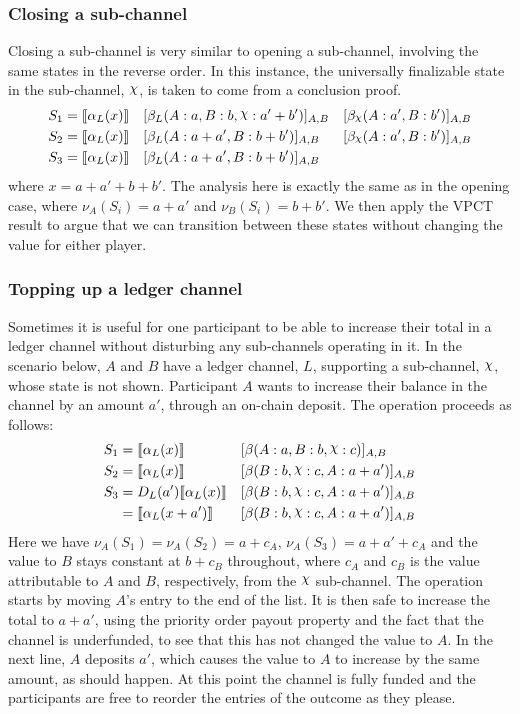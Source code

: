 \documentclass{article}
\DeclareRobustCommand{\rchi}{{\mathpalette\irchi\relax}}
\newcommand{\irchi}[2]{\raisebox{\depth}{$#1\chi$}} %
\theoremstyle{definition}
\newcommand{\adj}[1]{\llbracket #1 \rrbracket}
\newcommand{\enf}[1]{[#1]}
\begin{document}
\subsubsection{Closing a sub-channel}

Closing a sub-channel is very similar to opening a sub-channel, involving the same states in the reverse order.
In this instance, the universally finalizable state in the sub-channel, $\rchi$, is
taken to come from a conclusion proof.
\begin{align*}
S_1 &= \adj{\alpha_L(x)} &&\enf{\beta_L(A: a, B: b, \rchi: a' + b')}_{A, B}&\enf{\beta_\rchi(A: a', B: b')}_{A, B}\\
S_2 &= \adj{\alpha_L(x)} &&\enf{\beta_L(A: a + a', B: b + b')}_{A, B}&\enf{\beta_\rchi(A: a', B: b')}_{A, B} \\
S_3 &= \adj{\alpha_L(x)} &&\enf{\beta_L(A: a + a', B: b + b')}_{A, B} & 
\end{align*}
where $x = a + a' + b + b'$.
The analysis here is exactly the same as in the opening case, where $\nu_A(S_i) = a + a'$ and $\nu_B(S_i) = b + b'$.
We then apply the VPCT result to argue that we can transition between these states without changing the value for either player.

\subsubsection{Topping up a ledger channel}

Sometimes it is useful for one participant to be able to increase their total in a ledger channel without disturbing any sub-channels operating in it.
In the scenario below, $A$ and $B$ have a ledger channel, $L$, supporting a sub-channel, $\rchi$, whose state is not shown.
Participant $A$ wants to increase their balance in the channel by an amount $a'$, through an on-chain deposit.
The operation proceeds as follows:
\begin{align*}
S_1 &= \adj{\alpha_L(x)} &&\enf{\beta(A: a, B: b, \rchi: c)}_{A, B} \\
S_2 &= \adj{\alpha_L(x)} &&\enf{\beta(B: b, \rchi: c, A: a + a')}_{A, B} \\
S_3 &= D_L(a')\adj{\alpha_L(x)} &&\enf{\beta(B: b, \rchi: c, A: a + a')}_{A, B} \\
    &= \adj{\alpha_L(x + a')} &&\enf{\beta(B: b, \rchi: c, A: a + a')}_{A, B}
\end{align*}
Here we have $\nu_A(S_1) = \nu_A(S_2) = a + c_A$, $\nu_A(S_3) = a + a' + c_A$ and the value to $B$ stays constant at $b + c_B$ throughout, where $c_A$ and $c_B$ is the value attributable to $A$ and $B$, respectively, from the $\rchi$ sub-channel.
The operation starts by moving $A$'s entry to the end of the list.
It is then safe to increase the total to $a + a'$, using the priority order payout property and the fact that the channel is underfunded, to see that this has not changed the value to $A$.
In the next line, $A$ deposits $a'$, which causes the value to $A$ to increase by the same amount, as should happen.
At this point the channel is fully funded and the participants are free to reorder the entries of the outcome as they please.
\end{document}

